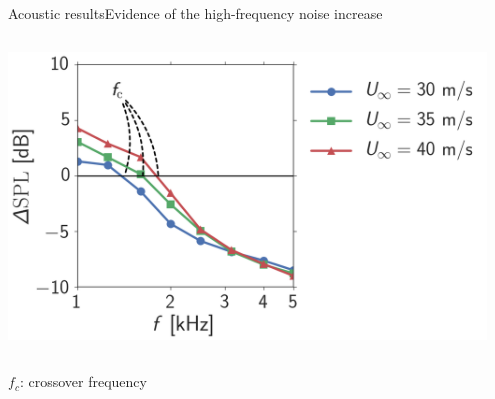 \documentclass[xcolor=table,aspectratio=169]{beamer}
\begin{document}
\begin{frame}{Acoustic results}{Evidence of the high-frequency noise increase}
\begin{columns}
        \includegraphics[width=0.95\textwidth]{scripts/acoustics/article_images/Relative_a12_p6.png}
    \end{columns}

    \begin{flushright}
        \scriptsize{$f_c$: crossover frequency}
    \end{flushright}
    
\end{frame}
\end{document}
